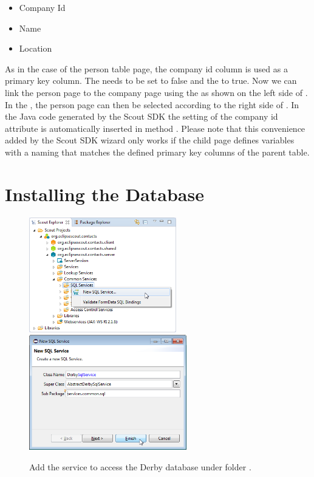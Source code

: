 \documentclass[a4paper,10pt,twoside]{book}
\begin{document}
\begin{itemize}
  \item{Company Id}
  \item{Name}
  \item{Location}
\end{itemize}

As in the case of the person table page, the company id column is used as a primary key column. 
The  needs to be set to false and the  to true. 
Now we can link the person page to the company page using the  as shown on the left side of . 
In the , the person page can then be selected according to the right side of . 
In the Java code generated by the Scout SDK the setting of the company id attribute is automatically inserted in method . 
Please note that this convenience added by the Scout SDK wizard only works if the child page defines variables with a naming that matches the defined primary key columns of the parent table. 

\section{Installing the Database}

\begin{figure}
\includegraphics[height=5cm]{new_service_derby_contextmenu.png} \hspace{5mm}
\includegraphics[height=5cm]{new_service_derby.png} 
\caption{Add the service to access the Derby database under folder . }
\end{figure}
\end{document}
